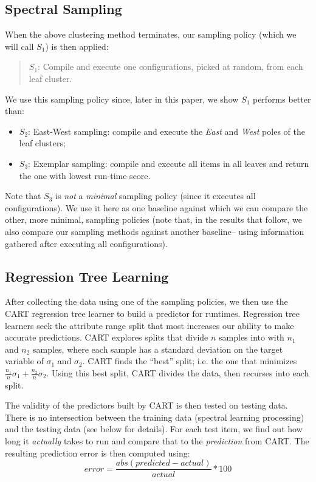 \documentclass{sig-alternative}
\newcommand{\bi}{\begin{itemize}}%
\newcommand{\ei}{\end{itemize}}
\begin{document}
\subsection{Spectral Sampling}\label{sect:sample}
When the above clustering method terminates, our  sampling policy (which we will call $S_1$) is then applied:
\begin{quote}
$S_1$: Compile and execute one  configurations,  picked at random, from each leaf cluster.
\end{quote}
We use this sampling policy since, later in this paper, we show $S_1$ performs better than:
\bi
\item $S_2$: East-West sampling: compile and execute the {\em East} and {\em West} poles of the leaf clusters;
\item $S_3$: Exemplar sampling: compile and execute all items in all leaves and return the one
with lowest run-time score.
\ei
Note that $S_3$ is {\em not} a {\em minimal} sampling policy (since it executes all configurations). 
We use it here as one  baseline
against which we can compare the other, more minimal, sampling policies (note that, in the results
that follow, we also compare our 
sampling methods against another baseline--
using information gathered after executing
all configurations).

\subsection{Regression Tree Learning}
After collecting the data using one of the sampling policies, we then use the CART regression tree learner \cite{breiman1984} to build a predictor for runtimes. Regression tree learners seek the attribute range split that most increases
our ability to make accurate predictions.
CART explores splits that divide $n$ samples  into   with $n_1$ and $n_2$ samples, where each sample  has a  standard deviation on the target variable of $\sigma_1$ and  $\sigma_2$.
CART finds the ``best'' split; i.e. the one that minimizes $\frac{n_1}{n}\sigma_1 + \frac{n_2}{n}\sigma_2$.
Using this best split, CART divides the data, then recurses into each split.
 

The validity of the predictors built by CART  is then tested on testing data. There is no intersection between the training data (spectral learning processing) and the testing data (see below for details). For each  test item, we find out how long it {\em actually} takes to run and compare that
to the {\em prediction} from CART. The resulting prediction error is then computed using:
\begin{equation}\label{eq:err}
\mathit{error}=\frac{\mathit{abs}(\mathit{predicted} - \mathit{actual})}{\mathit{actual}}*100
\end{equation}
\end{document}
